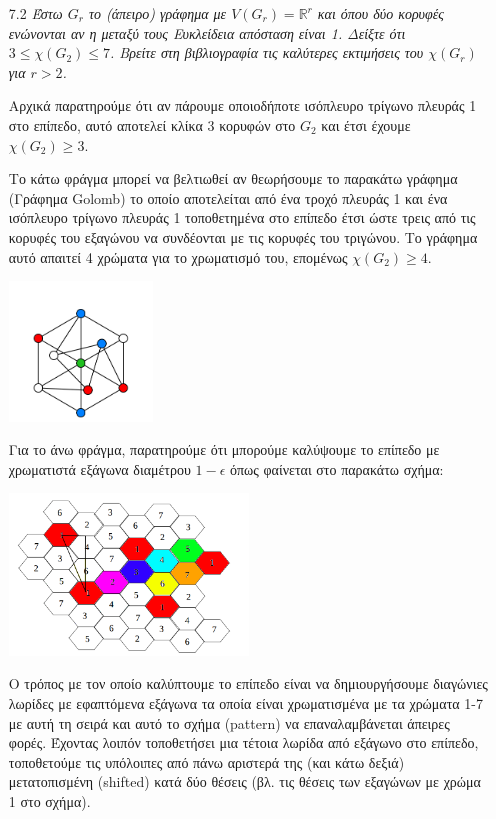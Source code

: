 \documentclass[a4paper, oneside, 11pt]{article}
\theoremstyle{definition}
\begin{document}
\begin{enumerate}
   \item[7.2] \emph{Έστω $G_r$ το (άπειρο) γράφημα με $V(G_r) = \mathbb{R}^r$
   και όπου δύο κορυφές ενώνονται αν η μεταξύ τους Ευκλείδεια απόσταση είναι
   1. Δείξτε ότι $3 \leq \chi(G_2) \leq 7$. Βρείτε στη βιβλιογραφία
   τις καλύτερες εκτιμήσεις του $\chi(G_r)$ για $r > 2$.}

   Αρχικά παρατηρούμε ότι αν πάρουμε οποιοδήποτε ισόπλευρο τρίγωνο
   πλευράς 1 στο επίπεδο, αυτό αποτελεί κλίκα 3 κορυφών στο $G_2$ και
   έτσι έχουμε $\chi(G_2) \geq 3$.

   Το κάτω φράγμα μπορεί να βελτιωθεί αν θεωρήσουμε το παρακάτω γράφημα
   (Γράφημα Golomb) το οποίο αποτελείται από ένα τροχό πλευράς 1 και ένα
   ισόπλευρο τρίγωνο πλευράς 1
   τοποθετημένα στο επίπεδο έτσι ώστε τρεις από τις κορυφές του εξαγώνου
   να συνδέονται με τις κορυφές του τριγώνου. Το γράφημα αυτό
   απαιτεί 4 χρώματα για το χρωματισμό του, επομένως $\chi(G_2) \geq 4$.

   \begin{center}
      \includegraphics[width=0.3\textwidth]{./pics/golomb.png}
   \end{center}

   Για το άνω φράγμα, παρατηρούμε ότι μπορούμε καλύψουμε το επίπεδο
   με χρωματιστά εξάγωνα διαμέτρου $1 - \epsilon$ όπως φαίνεται
   στο παρακάτω σχήμα:

   \begin{center}
      \includegraphics[width=0.5\textwidth]{./pics/grid.png}
   \end{center}

   Ο τρόπος με τον οποίο καλύπτουμε το επίπεδο είναι
   να δημιουργήσουμε διαγώνιες λωρίδες με εφαπτόμενα εξάγωνα τα οποία
   είναι χρωματισμένα με τα χρώματα 1-7 με αυτή τη σειρά και αυτό το
   σχήμα (pattern) να επαναλαμβάνεται άπειρες φορές. Έχοντας λοιπόν
   τοποθετήσει μια τέτοια λωρίδα από εξάγωνο στο επίπεδο, τοποθετούμε
   τις υπόλοιπες από πάνω αριστερά της (και κάτω δεξιά) μετατοπισμένη
   (shifted) κατά δύο θέσεις (βλ. τις θέσεις των εξαγώνων με χρώμα
   1 στο σχήμα).
   

\end{enumerate}
\end{document}
